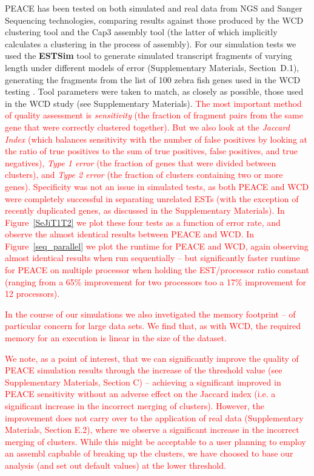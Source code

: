 \documentclass[a4,center,fleqn]{NAR}
\newcommand{\mc}[1]{\textcolor{red}{#1}}
\newcommand{\peace} {{\small PEACE}}
\newcommand{\wcd} {{\small WCD}}
\newcommand{\capthree} {{\small Cap3}}
\begin{document}
\peace\/ has been tested on both simulated and real data from NGS and
Sanger Sequencing technologies, comparing results against those
produced by the \wcd\/ clustering tool \cite{Hazelhurst08a} and the
\capthree\/ assembly tool \cite{Huang99} (the latter of which
implicitly calculates a clustering in the process of assembly).  For
our simulation tests we used the {\bf ESTSim} tool \cite{Hazelhurst03}
to generate simulated transcript fragments of varying length under
different models of error (Supplementary Materials, Section~D.1),
generating the fragments from the list of 100 zebra fish genes used in
the \wcd\/ testing \cite{Hazelhurst08a}.  Tool parameters were taken
to match, as closely as possible, those used in the \wcd\/ study (see
Supplementary Materials).  \mc{The most important method of quality
  assessment is {\it sensitivity} (the fraction of fragment pairs from
  the same gene that were} \mc{correctly clustered together).  But we
  also look at the {\it Jaccard Index} (which balances sensitivity
  with the number of false positives by looking at the ratio of true
  positives to the sum of true positives, false positives, and true
  negatives), {\it Type 1 error} (the fraction of genes that were
  divided between clusters), and {\it Type 2 error} (the fraction of
  clusters containing two or more genes).  Specificity was not an
  issue in simulated tests, as both \peace\/ and \wcd\/ were
  completely successful in separating unrelated ESTs (with the
  exception of recently duplicated genes, as discussed in the
  Supplementary Materials).  In Figure~\ref{SeJiT1T2} we plot these
  four tests as a function of error rate, and observe the almost
  identical results between \peace\/ and \wcd\/.  In
  Figure~\ref{seq_parallel} we plot the runtime for \peace\/ and
  \wcd\/, again observing almost identical results when run
  sequentially -- but significantly faster runtime for PEACE on
  multiple processor when holding the EST/processor ratio constant
  (ranging from a 65\% improvement for two processors too a 17\%
  improvement for 12 processors).}

\mc{In the course of our simulations we also invetigated the memory
  footprint -- of particular concern for large data sets.  We find
  that, as with \wcd, the required memory for an execution is linear
  in the size of the dataset.}

  \mc{We note, as a point of interest, that we can significantly
    improve the quality of \peace\/ simulation results through the
    increase of the threshold value (see Supplementary Materials,
    Section C) -- achieving a significant improved in PEACE
    sensitivity without an adverse effect on the Jaccard index (i.e. a
    significant increase in the incorrect merging of clusters).
    However, the improvement does not carry over to the application of
    real data (Supplementary Materials, Section E.2), where we observe
    a significant increase in the incorrect merging of clusters.
    While this might be acceptable to a user planning to employ an
    assembl capbable of breaking up the clusters, we have choosed to
    base our analysis (and set out default values) at the lower threshold.}
\end{document}

